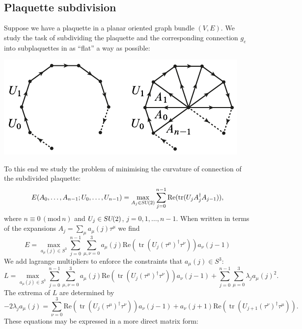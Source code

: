 \documentclass[12pt]{amsart}
\newcommand{\tr}{\operatorname{tr}}
\def\su2{\textsl{SU}(2)}
\theoremstyle{definition}
\theoremstyle{remark}
\numberwithin{equation}{section}
\begin{document}
\subsection{Plaquette subdivision}

Suppose we have a plaquette in a planar oriented graph bundle $(V,E)$. We study the task of subdividing the plaquette and the corresponding connection $g_e$ into subplaquettes in as ``flat'' a way as possible:
\begin{center}
	\includegraphics{plaquettesubdivision.pdf}
\end{center}
To this end we study the problem of minimising the curvature of connection of the subdivided plaquette:
\begin{equation}
	E(A_0, \ldots, A_{n-1}; U_0, \ldots, U_{n-1}) = \max_{A_j\in \su2} \sum_{j=0}^{n-1} \text{Re}(\tr(U_j A_j^\dag A_{j-1})),
\end{equation}
where $n\equiv 0\, (\text{mod}\, n)$ and $U_j\in \su2$, $j=0, 1, \ldots, n-1$. When written in terms of the expansions $A_j = \sum_{\mu} a_\mu(j) \tau^{\mu}$ we find
\begin{equation}
	E = \max_{a_\mu(j)\in S^3} \sum_{j=0}^{n-1}\sum_{\mu,\nu = 0}^3 a_\mu(j)\text{Re}(\tr(U_j (\tau^{\mu})^\dag \tau^\nu))a_\nu(j-1)
\end{equation}
We add lagrange multipliers to enforce the constraints that $a_\mu(j)\in S^3$:
\begin{equation}
	L = \max_{a_\mu(j)\in S^3} \sum_{j=0}^{n-1}\sum_{\mu,\nu = 0}^3 a_\mu(j)\text{Re}(\tr(U_j (\tau^{\mu})^\dag \tau^\nu))a_\nu(j-1) + \sum_{j=0}^{n-1}\sum_{\mu = 0}^3 \lambda_j a_\mu(j)^2.
\end{equation}
The extrema of $L$ are determined by
\begin{equation}
	-2\lambda_j a_\mu(j) = \sum_{\nu = 0}^3\text{Re}(\tr(U_j (\tau^{\mu})^\dag \tau^\nu))a_\nu(j-1) + a_\nu(j+1)\text{Re}(\tr(U_{j+1} (\tau^{\nu})^\dag \tau^\mu)).
\end{equation}
These equations may be expressed in a more direct matrix form:
\end{document}
